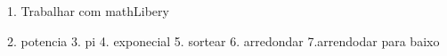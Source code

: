 1. Trabalhar com mathLibery

2. potencia
3. pi
4. exponecial
5. sortear
6. arredondar
7.arrendodar para baixo
